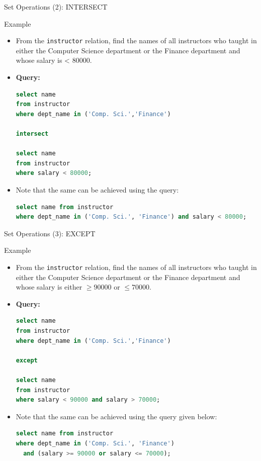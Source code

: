 \documentclass[aspectratio=169, xcolor=dvipsnames]{beamer}
\begin{document}
\begin{frame}[fragile]{Set Operations (2): INTERSECT}
    \begin{exampleblock}{Example}
        \begin{itemize}[<+->]
            \item From the \texttt{instructor} relation, find the names of all instructors who taught in either the Computer Science department or the Finance department and whose salary is < 80000.
            \item \textbf{Query:}
            \begin{lstlisting}[language=SQL]
select name 
from instructor 
where dept_name in ('Comp. Sci.','Finance') 

intersect 

select name 
from instructor 
where salary < 80000;
            \end{lstlisting}
            \item Note that the same can be achieved using the query:
            \begin{lstlisting}[language=SQL, basicstyle=\ttfamily\scriptsize]
select name from instructor 
where dept_name in ('Comp. Sci.', 'Finance') and salary < 80000;
            \end{lstlisting}
        \end{itemize}
    \end{exampleblock}
\end{frame}

\begin{frame}[fragile]{Set Operations (3): EXCEPT}
    \begin{exampleblock}{Example}
        \begin{itemize}[<+->]
            \item From the \texttt{instructor} relation, find the names of all instructors who taught in either the Computer Science department or the Finance department and whose salary is either $\ge 90000$ or $\le 70000$.
            \item \textbf{Query:}
            \begin{lstlisting}[language=SQL, basicstyle=\ttfamily\scriptsize]
select name 
from instructor 
where dept_name in ('Comp. Sci.','Finance') 

except 

select name 
from instructor 
where salary < 90000 and salary > 70000;
            \end{lstlisting}
            \item Note that the same can be achieved using the query given below:
            \begin{lstlisting}[language=SQL, basicstyle=\ttfamily\scriptsize]
select name from instructor 
where dept_name in ('Comp. Sci.', 'Finance') 
  and (salary >= 90000 or salary <= 70000);
            \end{lstlisting}
        \end{itemize}
    \end{exampleblock}
\end{frame}
\end{document}
